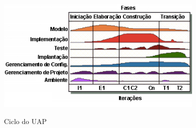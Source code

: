 \begin{figure}[htb!]
\begin{center}
\caption{Ciclo do UAP}
\label{fig:uap}
\includegraphics[width=10cm]{assets/uap} \\
\end{center}
\end{figure}


